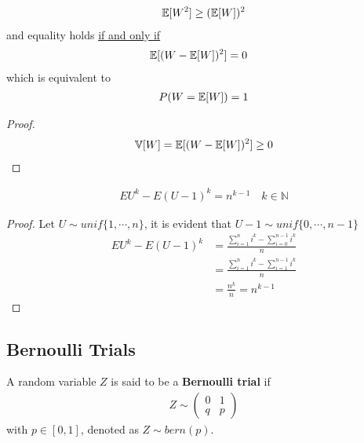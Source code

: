 \documentclass{article}
\begin{document}
   	\begin{corollary}
   		\begin{align}
   			\mathbb{E}[{W^2}] \geq (\mathbb{E}[{W}])^2
   		\end{align}
   		and equality holds \ul{if and only if}
   		\begin{align}
   			\mathbb{E}[{(W - \mathbb{E}[{W}])^2}] &= 0
   		\end{align}
   		which is equivalent to
   		\begin{align}
   			P(W = \mathbb{E}[{W}]) = 1
   		\end{align}
   	\end{corollary}
   	\begin{proof}
   		\begin{align}
	   		\mathbb{V}[{W}] = \mathbb{E}[{(W - \mathbb{E}[{W}])^2}] \geq 0
   		\end{align}
   	\end{proof}
   	
   	\begin{theorem}
   		\begin{align}
   			E U^{k}-E(U-1)^{k}=n^{k-1} \quad k \in \mathbb{N}
   		\end{align}
   	\end{theorem}
   	
   	\begin{proof}
   	Let $U \sim unif\{1, \cdots, n\}$, it is evident that $U - 1 \sim unif\{0, \cdots, n-1\}$
   		\begin{align}
   			EU^k - E(U-1)^k &= \frac{\sum_{i=1}^n i^k - \sum_{i=0}^{n-1} i^k}{n} \\
   			&= \frac{\sum_{i=1}^n i^k - \sum_{i=1}^{n-1} i^k}{n} \\
   			&= \frac{n^k}{n} = n^{k-1}
   		\end{align}
   	\end{proof}
   	
   	
   	\subsection{Bernoulli Trials}
   	\begin{definition}
   		A random variable $Z$ is said to be a \textbf{Bernoulli trial} if 
   		\begin{align}
   			Z \sim\left(\begin{array}{ll}{0} & {1} \\ {q} & {p}\end{array}\right)
   		\end{align}
   		with $p \in [0, 1]$, denoted as $Z \sim bern(p)$.
   	\end{definition}
   	
\end{document}
